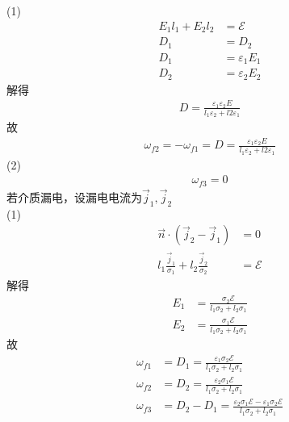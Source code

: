 \documentclass{phyasgn}
\begin{document}
\begin{sol}[3]
    (1)\begin{align*}
        E_1l_1+E_2l_2&=\mathscr{E}\\
        D_1&=D_2\\
        D_1&=\varepsilon_1E_1\\
        D_2&=\varepsilon_2E_2
    \end{align*}
    解得
    \begin{align*}
        D=\frac{\varepsilon_1\varepsilon_2E}{l_1\varepsilon_2+l2\varepsilon_1}
    \end{align*}
    故
    \begin{align*}
        \omega_{f2}=-\omega_{f1}=D=\frac{\varepsilon_1\varepsilon_2E}{l_1\varepsilon_2+l2\varepsilon_1}
    \end{align*}
    (2)
    \begin{align*}
        \omega_{f3}=0
    \end{align*}
    若介质漏电，设漏电电流为$\vec{j}_1,\vec{j}_2$\\
    (1)\begin{align*}
        \vec{n}\cdot(\vec{j}_2-\vec{j}_1)&=0\\
        l_1\frac{\vec{j}_1}{\sigma_1}+l_2\frac{\vec{j}_2}{\sigma_2}&=\mathscr{E}
    \end{align*}
    解得
    \begin{align*}
        E_1&=\frac{\sigma_2\mathscr{E}}{l_1\sigma_2+l_2\sigma_1}\\
        E_2&=\frac{\sigma_1\mathscr{E}}{l_1\sigma_2+l_2\sigma_1}
    \end{align*}
    故
    \begin{align*}
        \omega_{f1}&=D_1=\frac{\varepsilon_1\sigma_2\mathscr{E}}{l_1\sigma_2+l_2\sigma_1}\\
        \omega_{f2}&=D_2=\frac{\varepsilon_2\sigma_1\mathscr{E}}{l_1\sigma_2+l_2\sigma_1}\\
        \omega_{f3}&=D_2-D_1=\frac{\varepsilon_2\sigma_1\mathscr{E}-\varepsilon_1\sigma_2\mathscr{E}}{l_1\sigma_2+l_2\sigma_1}\\
    \end{align*}
\end{sol}\par
\end{document}
